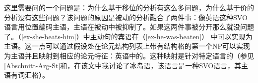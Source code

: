 
这里需要问的一个问题是：为什么基于移位的分析有这么多问题，为什么基于价的分析没有这些问题？该问题的原因是被动的分析融合了两件事：像英语这种SVO语言用位置编码主语，主语在被动中被抑制了。如果这两件事被分开那么就没问题了。（\ref{ex-she-beats-him}）中主动句的宾语在（\ref{ex-he-was-beaten}） 中可以实现为主语。这一点可以通过假设处在论元结构列表上带有结构格的第一个NP可以实现为主语并且映射到相应的论元特征：英语中的\sprc。这种映射是针对特定语言的（参见\ref{Abschnitt-Arg-St}和，在该文中我讨论了冰岛语，该语言是一种SVO语言，其主语有词汇格）。

